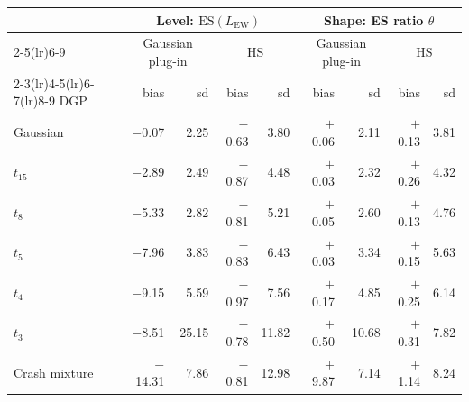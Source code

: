 \begin{tabular}{lrrrrrrrr}
\toprule
 & \multicolumn{4}{c}{Level: $\mathrm{ES}(L_{\mathrm{EW}})$} & \multicolumn{4}{c}{Shape: ES ratio $\theta$} \\
\cmidrule(lr){2-5}\cmidrule(lr){6-9}
 & \multicolumn{2}{c}{Gaussian plug-in} & \multicolumn{2}{c}{HS} & \multicolumn{2}{c}{Gaussian plug-in} & \multicolumn{2}{c}{HS} \\
\cmidrule(lr){2-3}\cmidrule(lr){4-5}\cmidrule(lr){6-7}\cmidrule(lr){8-9}
DGP & bias & sd & bias & sd & bias & sd & bias & sd \\
\midrule
Gaussian & $-$0.07 & 2.25 & $-$0.63 & 3.80 & $+$0.06 & 2.11 & $+$0.13 & 3.81 \\
$t_{15}$ & $-$2.89 & 2.49 & $-$0.87 & 4.48 & $+$0.03 & 2.32 & $+$0.26 & 4.32 \\
$t_8$ & $-$5.33 & 2.82 & $-$0.81 & 5.21 & $+$0.05 & 2.60 & $+$0.13 & 4.76 \\
$t_5$ & $-$7.96 & 3.83 & $-$0.83 & 6.43 & $+$0.03 & 3.34 & $+$0.15 & 5.63 \\
$t_4$ & $-$9.15 & 5.59 & $-$0.97 & 7.56 & $+$0.17 & 4.85 & $+$0.25 & 6.14 \\
$t_3$ & $-$8.51 & 25.15 & $-$0.78 & 11.82 & $+$0.50 & 10.68 & $+$0.31 & 7.82 \\
Crash mixture & $-$14.31 & 7.86 & $-$0.81 & 12.98 & $+$9.87 & 7.14 & $+$1.14 & 8.24 \\
\bottomrule
\end{tabular}